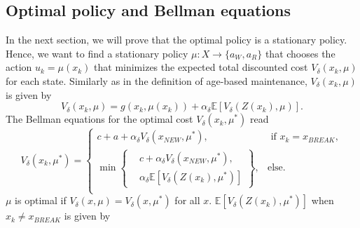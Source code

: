 \subsection{Optimal policy and Bellman equations}
In the next section, we will prove that the optimal policy is a stationary policy.
Hence, we want to find a stationary policy $\mu:X\rightarrow \{a_W,a_R\}$ that chooses the action $u_k=\mu(x_k)$ that minimizes the expected total discounted cost $V_\delta(x_k,\mu)$ for each state.
Similarly as in the definition of age-based maintenance, $V_\delta(x_k,\mu)$ is given by
\[V_\delta(x_k,\mu)=g(x_k,\mu(x_k))+\alpha_\delta \mathbb{E}[V_\delta(Z(x_k),\mu)].\]
The Bellman equations for the optimal cost $V_\delta(x_k,\mu^*)$ read
\begin{equation}\label{eq:SimpleFluidBellman}
V_\delta(x_k,\mu^*)=\begin{cases}
c+a+\alpha_\delta V_\delta(x_{NEW},\mu^*),&\text{ if }x_k=x_{BREAK},\\
\min\left\{\begin{split}&c+\alpha_\delta V_\delta(x_{NEW},\mu^*),\\&\alpha_\delta \mathbb{E}[V_\delta(Z(x_k),\mu^*)]\end{split}\right\},&\text{else.}\\
\end{cases}
\end{equation}
$\mu$ is optimal if $V_\delta(x,\mu)=V_\delta(x,\mu^*)$ for all $x$.
$\mathbb{E}[V_\delta(Z(x_k),\mu^*)]$ when $x_k\neq x_{BREAK}$ is given by 
